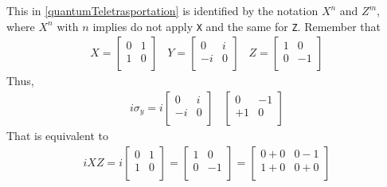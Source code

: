 \documentclass[a4paper,10pt]{article}
\begin{document}
This in \autoref{quantumTeletrasportation} is identified by the notation \texttt{$X^n$} and \texttt{$Z^m$}, where \texttt{$X^n$} with $n$ implies do not apply \texttt{X} and the same for \texttt{Z}. Remember that
\begin{equation*}
\begin{aligned}
X = \begin{bmatrix}
0 & 1 \\
1 & 0 \\
\end{bmatrix} \; \; \; 
Y = \begin{bmatrix}
0 & i \\
-i & 0 \\
\end{bmatrix} \; \; \;
Z = \begin{bmatrix}
1 & 0 \\
0 & -1 \\
\end{bmatrix}
\end{aligned}
\end{equation*}
Thus,
\begin{equation*}
\begin{aligned}
i\sigma_y = i\begin{bmatrix}
0 & i \\
-i & 0 \\
\end{bmatrix} \; \; \;
\begin{bmatrix}
0 & -1 \\
+1 & 0 \\
\end{bmatrix}
\end{aligned}
\end{equation*}
That is equivalent to
\begin{equation*}
\begin{aligned}
iXZ = i\begin{bmatrix}
0 & 1 \\
1 & 0 \\
\end{bmatrix} = 
\begin{bmatrix}
1 & 0 \\
0 & -1 \\
\end{bmatrix} = 
\begin{bmatrix}
0+0 & 0-1 \\
1+0 & 0+0 \\
\end{bmatrix}
\end{aligned}
\end{equation*}
\end{document}
